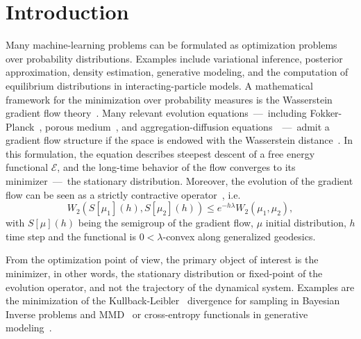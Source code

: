 \documentclass{article} %
\numberwithin{equation}{subsection}
\numberwithin{theorem}{section}
\newcommand{\cE}{\mathcal{E}}
\begin{document}
\section{Introduction}
    Many machine-learning problems can be formulated as optimization problems over probability distributions. 
    Examples include variational inference, posterior approximation, density estimation, generative modeling, and the computation of equilibrium distributions in interacting-particle models.
    A mathematical framework for the minimization over probability measures is the Wasserstein gradient flow theory~\cite{ambrosio2005gradient}.
    Many relevant evolution equations~---~including Fokker-Planck~\cite{jordan1998variational}, porous medium~\cite{otto2001geometry}, and aggregation-diffusion equations~\cite{carrillo2006contractions}~---~admit a gradient flow structure if the space is endowed with the Wasserstein distance~\cite{ambrosio2005gradient,villani2021topics}. 
    In this formulation, the equation describes steepest descent of a free energy functional $\cE$, and the long-time behavior of the flow converges to its minimizer~---~the stationary distribution. 
    Moreover, the evolution of the gradient flow can be seen as a strictly contractive operator~\cite[Theorem {11.2.1}]{ambrosio2005gradient}, i.e.
        \begin{equation}\label{eq:gradient_flow_contraction}
            W_2(S[\mu_1](h),  S[\mu_2](h)) \leq e^{-h \lambda} W_2(\mu_1, \mu_2),
        \end{equation}
    with $S[\mu](h)$ being the semigroup of the gradient flow, $\mu$ initial distribution, $h$ time step and the functional is $0 < \lambda$-convex along generalized geodesics.

    From the optimization point of view, the primary object of interest is the minimizer, in other words, the stationary distribution or fixed-point of the evolution operator, and not the trajectory of the dynamical system. Examples are the minimization of the Kullback-Leibler~\cite{kullback1951information} divergence for sampling in Bayesian Inverse problems and MMD~\cite{dziugaite2015training,arbel2019maximum} or cross-entropy functionals in generative modeling~\cite{goodfellow2014generative}.
\end{document}
